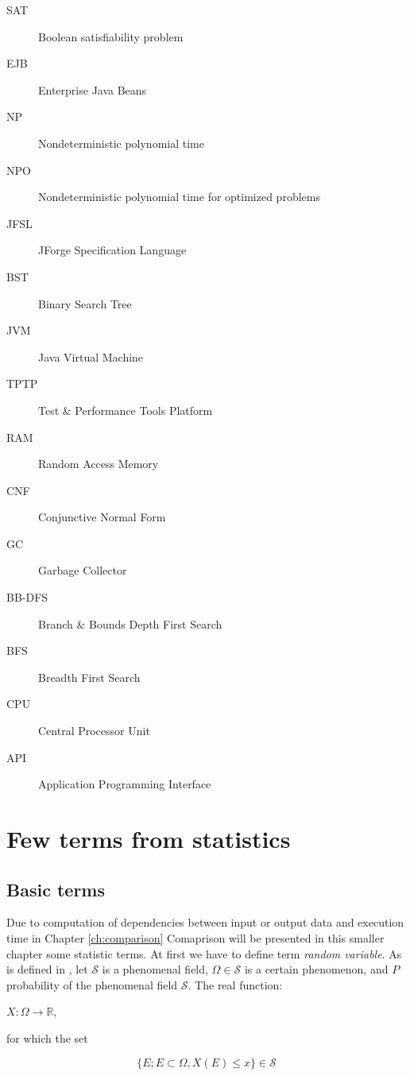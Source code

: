 \documentclass[11pt,twoside,a4paper]{book}
\begin{document}
\begin{description}
\item[SAT] Boolean satisfiability problem
\item[EJB] Enterprise Java Beans
\item[NP] Nondeterministic polynomial time
\item[NPO] Nondeterministic polynomial time for optimized problems
\item[JFSL] JForge Specification Language
\item[BST] Binary Search Tree
\item[JVM] Java Virtual Machine
\item[TPTP] Test \& Performance Tools Platform
\item[RAM] Random Access Memory
\item[CNF] Conjunctive Normal Form
\item[GC] Garbage Collector
\item[BB-DFS] Branch \& Bounds Depth First Search
\item[BFS] Breadth First Search
\item[CPU] Central Processor Unit
\item[API] Application Programming Interface
\end{description}


\chapter{Few terms from statistics}
\label{ch:statistics}

\section{Basic terms}
Due to computation of dependencies between input or output data and execution
time in Chapter \ref{ch:comparison} Comaprison will be presented in this smaller
chapter some statistic terms. At first we have to define term \textit{random
variable}. As is defined in \cite{navara:mvt}, let $\mathcal{S}$ is a
phenomenal field, $\Omega\in\mathcal{S}$ is a certain phenomenon, and
$P$ probability of the phenomenal field $\mathcal{S}$. The real
function: 
\begin{center}
$X:\Omega \rightarrow \mathbb{R}$,
\end{center}

for which the set

$$\{E; E \subset \Omega, X\left(E\right) \leq x\} \in
\mathcal{S}$$
\end{document}
